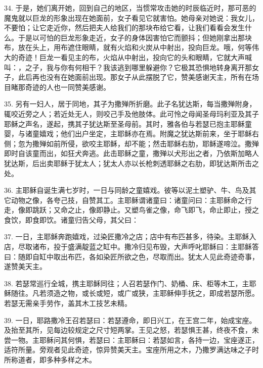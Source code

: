34. 于是，她们离开她，回到自己的地区，当惯常攻击她的时辰临近时，那可恶的魔鬼就以巨龙的形象出现在她面前，女子看见它就害怕。她母亲对她说：我女儿，不要怕；让它走近你，然后把夫人给我们的那块布给它看，让我们看看会发生什么。于是以可怕的巨龙形象走近，女子的身体因害怕它而颤抖；但她刚拿出那块布，放在头上，用布遮住眼睛，就有火焰和火炭从中射出，投向巨龙。哦，何等伟大的奇迹！巨龙一看见主的布，火焰从中射出，投向它的头和眼睛，它就大声喊叫：，之子，我与你有何相干？我该逃到哪里躲避你？它极其恐惧地转身离开那女子，此后再也没有在她面前出现。那女子从此摆脱了它，赞美感谢天主，所有在场目睹那奇迹的人也一同赞美感谢。\par

35. 另有一妇人，居于同地，其子为撒殚所折磨。此子名犹达斯，每当撒殚附身，辄咬近旁之人；若近处无人，则咬己手及他肢体。此可怜之母闻圣母玛利亚及其子耶稣之声名，遂起，携其子犹达斯至圣母前。其时，雅各伯与若瑟已抱主耶稣童婴，与诸童嬉戏；他们出户坐定，主耶稣亦在焉。附魔之犹达斯前来，坐于耶稣右侧；忽为撒殚如前所侵，欲咬主耶稣，却不能；然击耶稣右肋，耶稣遂啼泣。撒殚即时自该童而出，如狂犬奔逃。此击耶稣之童，撒殚以犬形出之者，乃依斯加略人犹达斯，后出卖耶稣于犹太人；犹太人亦以长枪刺透耶稣之右肋，即犹达斯所击之处。\par

36. 主耶稣自诞生满七岁时，一日与同龄之童嬉戏。彼等以泥土塑驴、牛、鸟及其它动物之像，各夸己技，自赞其工。主耶稣谓诸童曰：诸童问曰：主耶稣命之行走，像即跳跃；又命之止，像即静止。又塑鸟雀之像，命飞即飞，命止即止，授之食饮，即食即饮。诸童归告父母，其父曰：\par

37. 一日，主耶稣奔跑嬉戏，过染匠撒冷之店；店中有布匹甚多，待染。主耶稣入店，尽取诸布，投于盛满靛蓝之缸中。撒冷归见布毁，大声呼叱耶稣曰：主耶稣答曰：随即自缸中取出布匹，各如染匠所欲之色，尽取而出。犹太人见此奇迹奇事，遂赞美天主。\par

38. 若瑟常巡行全城，携主耶稣同往；人召若瑟作门、奶桶、床、柜等木工，主耶稣随往。凡若须造之物，或长或短，或广或狭，主耶稣伸手抚之，即成若瑟所愿。若瑟无需亲手劳作，盖其木工技艺未精。\par

39. 一日，耶路撒冷王召若瑟曰：若瑟遵命，即日兴工，在王宫二年，始成宝座。及抬至其所，见每边较规定之尺寸短两掌。王见之怒，若瑟惧王甚，终夜不食，未尝一物。主耶稣问其何惧，若瑟曰：主耶稣曰：若瑟如言，各持一边，宝座遂正，适符所量。旁观者见此奇迹，惊异赞美天主。宝座所用之木，乃撒罗满达味之子时所称道者，即多种多样之木。\par

